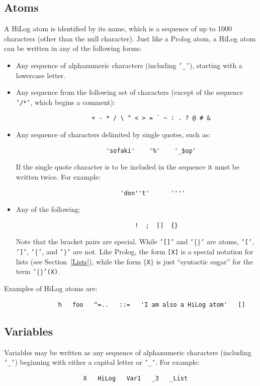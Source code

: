 \subsection{Atoms}
A HiLog atom is identified by its name, which is a sequence of up to 1000
characters (other than the null character).  Just like a Prolog atom, a HiLog
atom can be written in any of the following forms:
\begin{itemize}
\item Any sequence of alphanumeric characters (including {\tt '\_'}), starting
      with a lowercase letter.

\item Any sequence from the following set of characters (except of the
      sequence {\tt '/*'}, which begins a comment):
      \begin{verbatim}
                     + - * / \ ^ < > = ` ~ : . ? @ # &
      \end{verbatim}

\item Any sequence of characters delimited by single quotes, such as:
      \begin{verbatim}
                         'sofaki'    '%'    '_$op'
      \end{verbatim}
      If the single quote character is to be included in the sequence it must
      be written twice. For example:
      \begin{verbatim}
                             'don''t'      ''''
      \end{verbatim}

\item Any of the following:
      \begin{verbatim}
                                 !  ;  []  {}
      \end{verbatim}
      Note that the bracket pairs are special. While {\tt '[]'} and
      {\tt '$\{\}$'} are atoms, {\tt '['}, {\tt ']'}, {\tt '$\{$'},
      and  {\tt '$\}$'} are not.
      Like Prolog, the form {\tt [X]} is a special notation for lists
      (see Section~\ref{Lists}), while the form {\tt $\{$X$\}$} is
      just ``syntactic sugar'' for the term {\tt '$\{\}$'(X)}.
\end{itemize}

Examples of HiLog atoms are:
\begin{verbatim}
               h   foo   ^=..   ::=   'I am also a HiLog atom'   []
\end{verbatim}


\subsection{Variables}
Variables may be written as any sequence of alphanumeric characters
(including {\tt '\_'}) beginning with either a capital letter or {\tt '\_'}.
For example:
\begin{verbatim}
                      X   HiLog   Var1   _3   _List
\end{verbatim}

